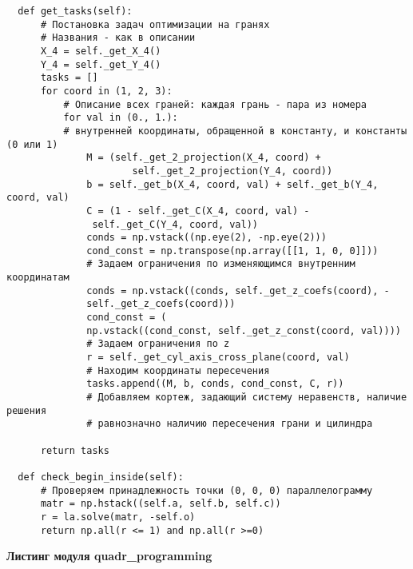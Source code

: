 \documentclass[pdftex,ptm,12pt,a4paper]{report}
\begin{document}
\begin{verbatim}
  def get_tasks(self):
      # Постановка задач оптимизации на гранях
      # Названия - как в описании
      X_4 = self._get_X_4()
      Y_4 = self._get_Y_4()
      tasks = []
      for coord in (1, 2, 3):
          # Описание всех граней: каждая грань - пара из номера
          for val in (0., 1.):
          # внутренней координаты, обращенной в константу, и константы (0 или 1)
              M = (self._get_2_projection(X_4, coord) +
                      self._get_2_projection(Y_4, coord))
              b = self._get_b(X_4, coord, val) + self._get_b(Y_4, coord, val)
              C = (1 - self._get_C(X_4, coord, val) -
               self._get_C(Y_4, coord, val))
              conds = np.vstack((np.eye(2), -np.eye(2)))
              cond_const = np.transpose(np.array([[1, 1, 0, 0]]))
              # Задаем ограничения по изменяющимся внутренним координатам
              conds = np.vstack((conds, self._get_z_coefs(coord), -
              self._get_z_coefs(coord)))
              cond_const = (
              np.vstack((cond_const, self._get_z_const(coord, val))))
              # Задаем ограничения по z
              r = self._get_cyl_axis_cross_plane(coord, val)
              # Находим координаты пересечения
              tasks.append((M, b, conds, cond_const, C, r))
              # Добавляем кортеж, задающий систему неравенств, наличие решения
              # равнозначно наличию пересечения грани и цилиндра

      return tasks

  def check_begin_inside(self):
      # Проверяем принадлежность точки (0, 0, 0) параллелограмму
      matr = np.hstack((self.a, self.b, self.c))
      r = la.solve(matr, -self.o)
      return np.all(r <= 1) and np.all(r >=0)
\end{verbatim}

\textbf{Листинг модуля quadr\_programming}
\end{document}
